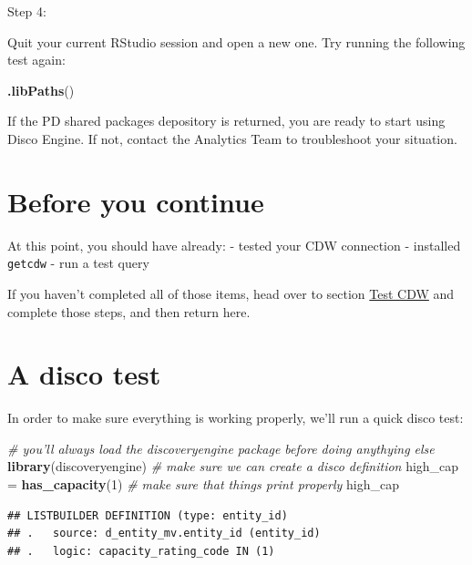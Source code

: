 \documentclass[]{book}
\newenvironment{Shaded}{\begin{snugshade}}{\end{snugshade}}
\newcommand{\CommentTok}[1]{\textcolor[rgb]{0.56,0.35,0.01}{\textit{#1}}}
\newcommand{\DecValTok}[1]{\textcolor[rgb]{0.00,0.00,0.81}{#1}}
\newcommand{\KeywordTok}[1]{\textcolor[rgb]{0.13,0.29,0.53}{\textbf{#1}}}
\newcommand{\NormalTok}[1]{#1}
\newcommand{\StringTok}[1]{\textcolor[rgb]{0.31,0.60,0.02}{#1}}
\begin{document}
Step 4:

Quit your current RStudio session and open a new one. Try running the following test again:

\begin{Shaded}
\begin{Highlighting}[]
\KeywordTok{.libPaths}\NormalTok{()}
\end{Highlighting}
\end{Shaded}

If the PD shared packages depository is returned, you are ready to start using Disco Engine. If not, contact the Analytics Team to troubleshoot your situation.

\hypertarget{before-you-continue}{%
\section{Before you continue}\label{before-you-continue}}

At this point, you should have already:
- tested your CDW connection
- installed \texttt{getcdw}
- run a test query

If you haven't completed all of those items, head over to section \protect\hyperlink{test-cdw}{Test CDW} and complete those steps, and then return here.

\hypertarget{a-disco-test}{%
\section{A disco test}\label{a-disco-test}}

In order to make sure everything is working properly, we'll run a quick disco test:

\begin{Shaded}
\begin{Highlighting}[]
\CommentTok{# you'll always load the discoveryengine package before doing anythying else}
\KeywordTok{library}\NormalTok{(discoveryengine)}
\CommentTok{# make sure we can create a disco definition}
\NormalTok{high_cap =}\StringTok{ }\KeywordTok{has_capacity}\NormalTok{(}\DecValTok{1}\NormalTok{)}
\CommentTok{# make sure that things print properly}
\NormalTok{high_cap}
\end{Highlighting}
\end{Shaded}

\begin{verbatim}
## LISTBUILDER DEFINITION (type: entity_id)
## .   source: d_entity_mv.entity_id (entity_id)
## .   logic: capacity_rating_code IN (1)
\end{verbatim}
\end{document}
